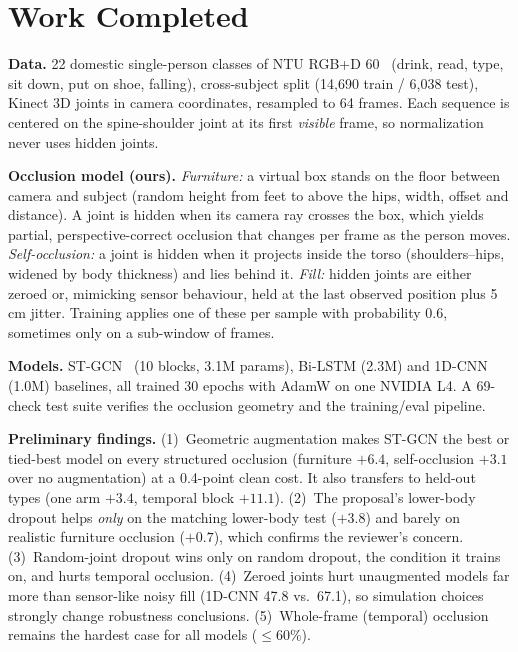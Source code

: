 \documentclass[11pt,twocolumn,letterpaper]{article}
\begin{document}
\section{Work Completed}
\textbf{Data.} 22 domestic single-person classes of NTU RGB+D 60~\cite{shahroudy2016ntu} (\eg drink, read, type, sit down, put on shoe, falling),
cross-subject split (14{,}690 train / 6{,}038 test), Kinect 3D joints in camera coordinates, resampled to 64 frames.
Each sequence is centered on the spine-shoulder joint at its first \emph{visible} frame, so normalization never uses hidden joints.

\textbf{Occlusion model (ours).}
\emph{Furniture:} a virtual box stands on the floor between camera and subject (random height from feet to above the hips, width, offset and distance).
A joint is hidden when its camera ray crosses the box, which yields partial, perspective-correct occlusion that changes per frame as the person moves.
\emph{Self-occlusion:} a joint is hidden when it projects inside the torso (shoulders--hips, widened by body thickness) and lies behind it.
\emph{Fill:} hidden joints are either zeroed or, mimicking sensor behaviour, held at the last observed position plus 5\,cm jitter.
Training applies one of these per sample with probability 0.6, sometimes only on a sub-window of frames.

\textbf{Models.} ST-GCN~\cite{yan2018stgcn} (10 blocks, 3.1M params), Bi-LSTM (2.3M) and 1D-CNN (1.0M) baselines, all trained 30 epochs with AdamW on one NVIDIA L4.
A 69-check test suite verifies the occlusion geometry and the training/eval pipeline.

\textbf{Preliminary findings.}
(1)~Geometric augmentation makes ST-GCN the best or tied-best model on every structured occlusion
(furniture $+6.4$, self-occlusion $+3.1$ over no augmentation) at a 0.4-point clean cost.
It also transfers to held-out types (one arm $+3.4$, temporal block $+11.1$).
(2)~The proposal's lower-body dropout helps \emph{only} on the matching lower-body test ($+3.8$) and barely on realistic furniture occlusion ($+0.7$), which confirms the reviewer's concern.
(3)~Random-joint dropout wins only on random dropout, the condition it trains on, and hurts temporal occlusion.
(4)~Zeroed joints hurt unaugmented models far more than sensor-like noisy fill (1D-CNN 47.8 vs.\ 67.1), so simulation choices strongly change robustness conclusions.
(5)~Whole-frame (temporal) occlusion remains the hardest case for all models ($\leq$60\%).
\end{document}
